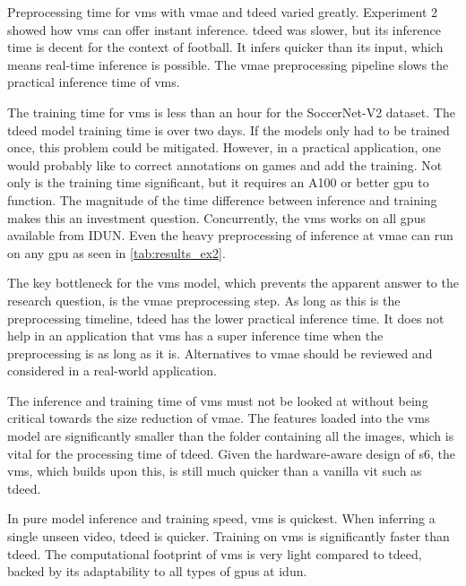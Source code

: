 Preprocessing time for \acrshort{vms} with \acrshort{vmae} and \acrshort{tdeed} varied greatly. Experiment 2 showed how \acrshort{vms} can offer instant inference. \acrshort{tdeed} was slower, but its inference time is decent for the context of football. It infers quicker than its input, which means real-time inference is possible. The \acrshort{vmae} preprocessing pipeline slows the practical inference time of \acrshort{vms}. 

The training time for \acrshort{vms} is less than an hour for the SoccerNet-V2 dataset. The \acrshort{tdeed} model training time is over two days. If the models only had to be trained once, this problem could be mitigated. However, in a practical application, one would probably like to correct annotations on games and add the training. Not only is the training time significant, but it requires an A100 or better \acrshort{gpu} to function. The magnitude of the time difference between inference and training makes this an investment question. Concurrently, the \acrshort{vms} works on all \acrshort{gpu}s available from IDUN. Even the heavy preprocessing of inference at \acrshort{vmae} can run on any \acrshort{gpu} as seen in \cref{tab:results_ex2}.

The key bottleneck for the \acrshort{vms} model, which prevents the apparent answer to the research question, is the \acrshort{vmae} preprocessing step. As long as this is the preprocessing timeline, \acrshort{tdeed} has the lower practical inference time. It does not help in an application that \acrshort{vms} has a super inference time when the preprocessing is as long as it is. Alternatives to \acrshort{vmae} should be reviewed and considered in a real-world application. 

The inference and training time of \acrshort{vms} must not be looked at without being critical towards the size reduction of \acrshort{vmae}. The features loaded into the \acrshort{vms} model are significantly smaller than the folder containing all the images, which is vital for the processing time of \acrshort{tdeed}. Given the hardware-aware design of \acrfull{s6}, the \acrshort{vms}, which builds upon this, is still much quicker than a vanilla \acrfull{vit} such as \acrshort{tdeed}.

In pure model inference and training speed, \acrshort{vms} is quickest. When inferring a single unseen video, \acrshort{tdeed} is quicker. Training on \acrshort{vms} is significantly faster than \acrshort{tdeed}. The computational footprint of \acrshort{vms} is very light compared to \acrshort{tdeed}, backed by its adaptability to all types of \acrshort{gpu}s at \acrshort{idun}. 


